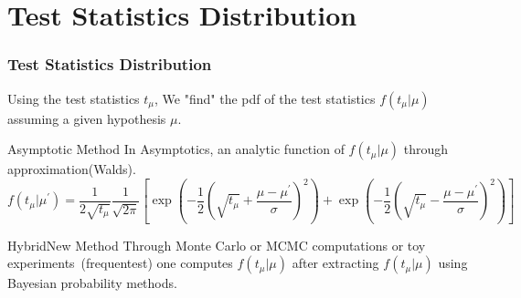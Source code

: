 \documentclass[12pt]{beamer}
\begin{document}
\section{Test Statistics Distribution}
\begin{frame}
\frametitle{Test Statistics Distribution}
\vspace{0.5cm}
 \begin{minipage}{\textwidth}
  Using the test statistics $t_{\mu}$,  We \alert{"find"} the pdf of the test statistics $f(t_{\mu}|\mu)$ assuming a given hypothesis $\mu$.
 \end{minipage}


\begin{varblock}[7cm]{Asymptotic Method}
In Asymptotics, an analytic function of $f(t_{\mu}|\mu)$ through approximation(\alert{Walds}). 
\tiny{
\begin{equation*}
f(t_{\mu}|{\mu}^{\prime}) =\frac{1}{2\sqrt{t_{\mu}}}\frac{1}{\sqrt{2\pi}}\left[ \exp\left(-\frac{1}{2}(  \sqrt{t_{\mu}} + \frac{\mu - {\mu}^{\prime}}{\sigma})^{2}\right) +  \exp\left(-\frac{1}{2}(  \sqrt{t_{\mu}} - \frac{\mu - {\mu}^{\prime}}{\sigma})^{2}\right) \right]                            
\end{equation*}
}
\end{varblock}\hfill%
\vspace{-0.5cm}
\begin{varblock}[7cm]{HybridNew Method}
Through Monte Carlo or MCMC computations or toy experiments~(frequentest) one computes $f(t_{\mu}|\mu)$  after extracting $f(t_{\mu}|\mu)$ using Bayesian probability methods.
\end{varblock}\hfill
\end{frame}
\end{document}
